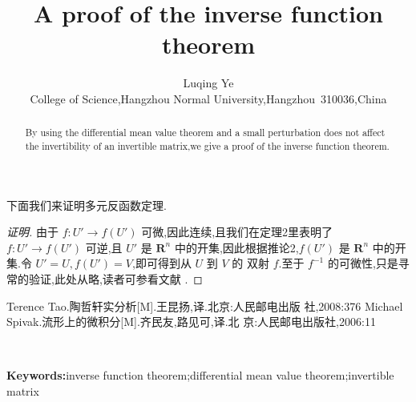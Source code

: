 \documentclass[twoside,11pt]{article}
\begin{document}
下面我们来证明多元反函数定理.
\begin{proof}[证明]
  由于 $f:U'\to f(U')$ 可微,因此连续,且我们在定理2里表明了 $f:U'\to
f(U')$ 可逆,且 $U'$ 是 $\mathbf{R}^n$ 中的开集,因此根据推论2,$f(U')$
是 $\mathbf{R}^n$ 中的开集.令 $U'=U,f(U')=V$,即可得到从 $U$ 到 $V$ 的
双射 $f$.至于 $f^{-1}$ 的可微性,只是寻常的验证,此处从略,读者可参看文献 \cite{tao}.
\end{proof}
%
\begin{thebibliography}{}
Terence Tao.陶哲轩实分析[M].王昆扬,译.北京:人民邮电出版
  社,2008:376
Michael Spivak.流形上的微积分[M].齐民友,路见可,译.北
  京:人民邮电出版社,2006:11

%    

\end{thebibliography}
\centering\title{{\textbf{{A proof of the inverse function theorem}}}}
\bigskip\\\author{\small{Luqing Ye}\\{\small{College of Science,Hangzhou Normal
      University,Hangzhou~310036,China}}}
\maketitle
\begin{abstract}
  By using the differential mean value theorem and a small
  perturbation does not affect the invertibility of an invertible
  matrix,we give a proof of the inverse function theorem.
\end{abstract}
\textbf{\small{Keywords}:}inverse function theorem;differential mean
value theorem;invertible matrix
\end{document}
